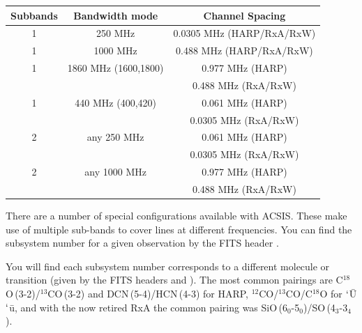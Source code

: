 \documentclass[11pt,oneside,chapters]{starlink}
\begin{document}
\newpage
\begin{table}[h!]
\begin{center}
\begin{tabular}{c|c|c}
\hline
\textbf{Subbands} & \textbf{Bandwidth mode}  & \textbf{Channel Spacing}\\
\hline
1 & 250 MHz & 0.0305 MHz (HARP/RxA/RxW)\\
1 &1000 MHz & 0.488 MHz (HARP/RxA/RxW)\\
1 &1860 MHz (1600,1800) & 0.977 MHz (HARP) \\
  &         & 0.488 MHz (RxA/RxW)\\
1 & 440 MHz (400,420) & 0.061 MHz (HARP) \\
  &         & 0.0305 MHz (RxA/RxW)\\
\hline
2 & any 250 MHz      & 0.061 MHz (HARP)\\
  &         & 0.0305 MHz (RxA/RxW)\\
2 &any 1000 MHz & 0.977 MHz (HARP) \\
  &         & 0.488 MHz (RxA/RxW)\\
\hline
\end{tabular}
\label{fig:backend}
\end{center}
\end{table}
There are a number of special configurations available with ACSIS.
These make use of multiple sub-bands to cover lines at different
frequencies.  You can find the subsystem number for a given
observation by the FITS header .

You will find each subsystem number corresponds to a different
molecule or transition (given by the FITS headers  and
). The most common pairings are
C$^{18}$O\,(3-2)/$^{13}$CO\,(3-2) and DCN\,(5-4)/HCN\,(4-3) for HARP,
$^{12}$CO/$^{13}$CO/C$^{18}$O for $`$\=U$`$\=u, and with the now retired
RxA the common pairing was SiO\,(6$_0$-5$_0$)/SO\,(4$_3$-3$_4$).
\end{document}
